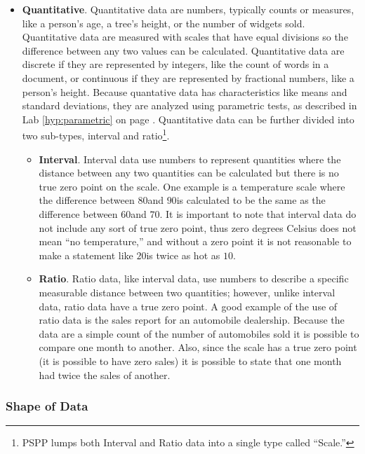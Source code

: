 \begin{itemize}
  \item \textbf{Quantitative}. Quantitative data are numbers, typically counts or measures, like a person's age, a tree's height, or the number of widgets sold. Quantitative data are measured with scales that have equal divisions so the difference between any two values can be calculated. Quantitative data are discrete if they are represented by integers, like the count of words in a document, or continuous if they are represented by fractional numbers, like a person's height. Because quantative data has characteristics like means and standard deviations, they are analyzed using parametric tests, as described in Lab \ref{hyp:parametric} on page \pageref{hyp:parametric}. Quantitative data can be further divided into two sub-types, interval and ratio\footnote{\acs{PSPP} lumps both Interval and Ratio data into a single type called ``Scale.''}.
  
    \begin{itemize}
      \item \textbf{Interval}. Interval data use numbers to represent quantities where the distance between any two quantities can be calculated but there is no true zero point on the scale. One example is a temperature scale where the difference between $ 80 $\textdegree and $ 90 $\textdegree is calculated to be the same as the difference between $ 60 $\textdegree and $ 70 $\textdegree. It is important to note that interval data do not include any sort of true zero point, thus zero degrees Celsius does not mean ``no temperature,'' and without a zero point it is not reasonable to make a statement like $ 20 $\textdegree is twice as hot as $ 10 $\textdegree.
    
      \item \textbf{Ratio}. Ratio data, like interval data, use numbers to describe a specific measurable distance between two quantities; however, unlike interval data, ratio data have a true zero point. A good example of the use of ratio data is the sales report for an automobile dealership. Because the data are a simple count of the number of automobiles sold it is possible to compare one month to another. Also, since the scale has a true zero point (it is possible to have zero sales) it is possible to state that one month had twice the sales of another.
    \end{itemize}
\end{itemize}
  
\subsubsection{Shape of Data}

